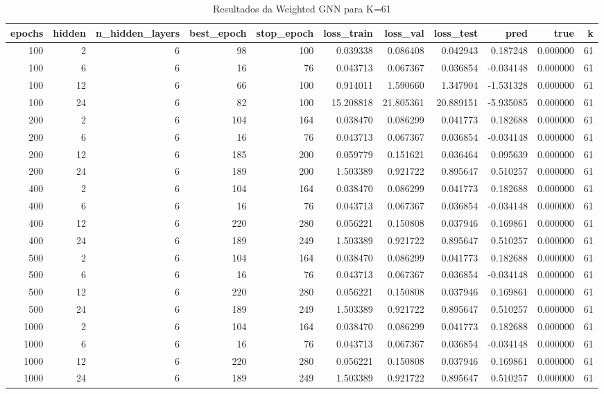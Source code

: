 \begin{table}
\caption{Resultados da Weighted GNN para K=61}
\label{tab:weighted_gnn_results_k61}
\begin{tabular}{rrrrrrrrrrr}
\toprule
epochs & hidden & n\_hidden\_layers & best\_epoch & stop\_epoch & loss\_train & loss\_val & loss\_test & pred & true & k \\
\midrule
100 & 2 & 6 & 98 & 100 & 0.039338 & 0.086408 & 0.042943 & 0.187248 & 0.000000 & 61 \\
100 & 6 & 6 & 16 & 76 & 0.043713 & 0.067367 & 0.036854 & -0.034148 & 0.000000 & 61 \\
100 & 12 & 6 & 66 & 100 & 0.914011 & 1.590660 & 1.347904 & -1.531328 & 0.000000 & 61 \\
100 & 24 & 6 & 82 & 100 & 15.208818 & 21.805361 & 20.889151 & -5.935085 & 0.000000 & 61 \\
200 & 2 & 6 & 104 & 164 & 0.038470 & 0.086299 & 0.041773 & 0.182688 & 0.000000 & 61 \\
200 & 6 & 6 & 16 & 76 & 0.043713 & 0.067367 & 0.036854 & -0.034148 & 0.000000 & 61 \\
200 & 12 & 6 & 185 & 200 & 0.059779 & 0.151621 & 0.036464 & 0.095639 & 0.000000 & 61 \\
200 & 24 & 6 & 189 & 200 & 1.503389 & 0.921722 & 0.895647 & 0.510257 & 0.000000 & 61 \\
400 & 2 & 6 & 104 & 164 & 0.038470 & 0.086299 & 0.041773 & 0.182688 & 0.000000 & 61 \\
400 & 6 & 6 & 16 & 76 & 0.043713 & 0.067367 & 0.036854 & -0.034148 & 0.000000 & 61 \\
400 & 12 & 6 & 220 & 280 & 0.056221 & 0.150808 & 0.037946 & 0.169861 & 0.000000 & 61 \\
400 & 24 & 6 & 189 & 249 & 1.503389 & 0.921722 & 0.895647 & 0.510257 & 0.000000 & 61 \\
500 & 2 & 6 & 104 & 164 & 0.038470 & 0.086299 & 0.041773 & 0.182688 & 0.000000 & 61 \\
500 & 6 & 6 & 16 & 76 & 0.043713 & 0.067367 & 0.036854 & -0.034148 & 0.000000 & 61 \\
500 & 12 & 6 & 220 & 280 & 0.056221 & 0.150808 & 0.037946 & 0.169861 & 0.000000 & 61 \\
500 & 24 & 6 & 189 & 249 & 1.503389 & 0.921722 & 0.895647 & 0.510257 & 0.000000 & 61 \\
1000 & 2 & 6 & 104 & 164 & 0.038470 & 0.086299 & 0.041773 & 0.182688 & 0.000000 & 61 \\
1000 & 6 & 6 & 16 & 76 & 0.043713 & 0.067367 & 0.036854 & -0.034148 & 0.000000 & 61 \\
1000 & 12 & 6 & 220 & 280 & 0.056221 & 0.150808 & 0.037946 & 0.169861 & 0.000000 & 61 \\
1000 & 24 & 6 & 189 & 249 & 1.503389 & 0.921722 & 0.895647 & 0.510257 & 0.000000 & 61 \\
\bottomrule
\end{tabular}
\end{table}

